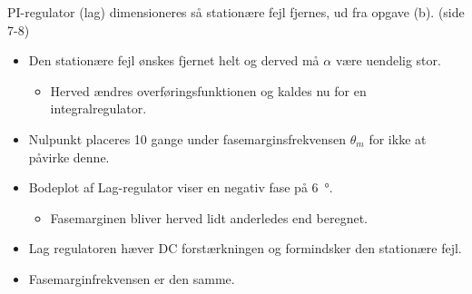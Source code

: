 \documentclass[danish]{article}
\begin{document}
\vspace{3mm}
PI-regulator (lag) dimensioneres så stationære fejl fjernes, ud fra opgave (b). (side 7-8)
\begin{itemize}
	\item Den stationære fejl ønskes fjernet helt og derved må $\alpha$ være uendelig stor.
	\begin{itemize}
		\item Herved ændres overføringsfunktionen og kaldes nu for en integralregulator.
	\end{itemize} 
	\item Nulpunkt placeres 10 gange under fasemarginsfrekvensen $\theta_m$ for ikke at påvirke denne.
	\item Bodeplot af Lag-regulator viser en negativ fase på \SI{6}{\degree}.
	\begin{itemize}
		\item Fasemarginen bliver herved lidt anderledes end beregnet.
	\end{itemize}
	\item Lag regulatoren hæver DC forstærkningen og formindsker den stationære fejl.
	\item Fasemarginfrekvensen er den samme.
\end{itemize}

\newpage
\end{document}
